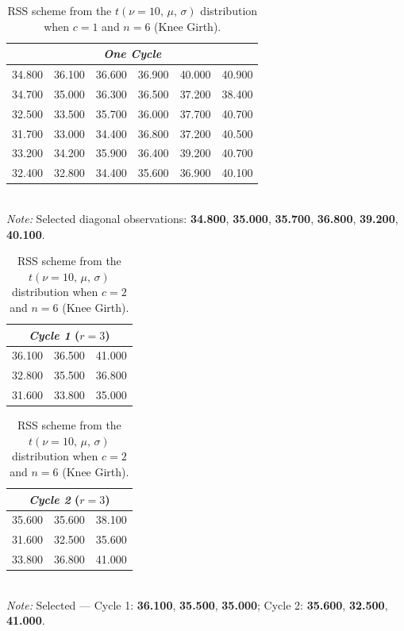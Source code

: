 \documentclass[12pt, a4paper]{article}
\begin{document}
\begin{table}[H]
  \centering
  \caption{RSS scheme from the $t(\nu=10,\,\mu,\,\sigma)$ distribution
           when $c = 1$ and $n = 6$ (Knee Girth).}
  \label{tab:rss_n6}
  \begin{tabular}{cccccc}
    \toprule
    \multicolumn{6}{c}{\textit{One Cycle}} \\
    \midrule
    34.800 & 36.100 & 36.600 & 36.900 & 40.000 & 40.900 \\
    34.700 & 35.000 & 36.300 & 36.500 & 37.200 & 38.400 \\
    32.500 & 33.500 & 35.700 & 36.000 & 37.700 & 40.700 \\
    31.700 & 33.000 & 34.400 & 36.800 & 37.200 & 40.500 \\
    33.200 & 34.200 & 35.900 & 36.400 & 39.200 & 40.700 \\
    32.400 & 32.800 & 34.400 & 35.600 & 36.900 & 40.100 \\
    \bottomrule
  \end{tabular}
  \smallskip\\
  \footnotesize
  \textit{Note:} Selected diagonal observations:
  \textbf{34.800}, \textbf{35.000}, \textbf{35.700}, \textbf{36.800},
  \textbf{39.200}, \textbf{40.100}.
\end{table}

\begin{table}[H]
  \centering
  \caption{RSS scheme from the $t(\nu=10,\,\mu,\,\sigma)$ distribution
           when $c = 2$ and $n = 6$ (Knee Girth).}
  \label{tab:rss2_n6}
  \begin{tabular}{ccc}
    \toprule
    \multicolumn{3}{c}{\textit{Cycle 1} ($r = 3$)} \\
    \midrule
    36.100 & 36.500 & 41.000 \\
    32.800 & 35.500 & 36.800 \\
    31.600 & 33.800 & 35.000 \\
    \bottomrule
  \end{tabular}
  \quad
  \begin{tabular}{ccc}
    \toprule
    \multicolumn{3}{c}{\textit{Cycle 2} ($r = 3$)} \\
    \midrule
    35.600 & 35.600 & 38.100 \\
    31.600 & 32.500 & 35.600 \\
    33.800 & 36.800 & 41.000 \\
    \bottomrule
  \end{tabular}
  \smallskip\\
  \footnotesize
  \textit{Note:} Selected — Cycle 1: \textbf{36.100}, \textbf{35.500},
  \textbf{35.000}; Cycle 2: \textbf{35.600}, \textbf{32.500},
  \textbf{41.000}.
\end{table}
\end{document}
